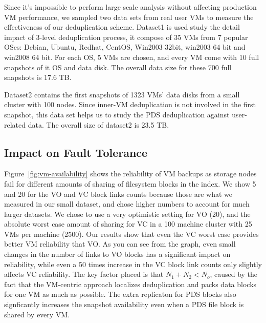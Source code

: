 

Since it's impossible to perform large scale analysis without affecting production VM performance,
we sampled two data sets from real user VMs to measure the effectiveness of our deduplication scheme.
Dataset1 is used study the detail impact of 3-level deduplication process,
it compose of 35 VMs from 7 popular OSes: 
Debian, Ubuntu, Redhat, CentOS, Win2003 32bit, win2003 64 bit and win2008 64 bit. For each OS, 
5 VMs are chosen, and every VM come with 10 full snapshots of it OS and data disk. 
The overall data size for these 700 full snapshots is 17.6 TB.

Dataset2 contains the first snapshots of 1323 VMs' data disks from a small cluster with 100 nodes. 
Since inner-VM deduplication is not involved in the first snapshot, this data set helps us to 
study the PDS deduplication against user-related data. The overall size of dataset2 is 23.5 TB.

\subsection{Impact on Fault Tolerance}

Figure~\ref{fig:vm-availability} shows the reliability of VM backups as storage
nodes fail for different amounts of sharing of filesystem blocks in the index. We
show 5 and 20 for the VO and VC block links counts because those are what we
measured in our small dataset, and chose higher numbers to account for much
larger datasets. We chose to use a very optimistic setting for VO (20), and the
absolute worst case amount of sharing for VC in a 100 machine cluster with 25
VMs per machine (2500). Our results show that even the VC worst case provides
better VM reliability that VO. As you can see from the graph, even small
changes in the number of links to VO blocks has a significant impact on
reliability, while even a 50 times increase in the VC block link counts only
slightly affects VC reliability.  The key factor placed is that  $N_1 +N_2 <
N_o$, caused by the fact that the VM-centric approach localizes deduplication
and packs  data blocks for one VM as much as possible.  The extra replicaton
for PDS blocks also signficantly increases the snapshot availability even when
a PDS file block is shared by every VM.

